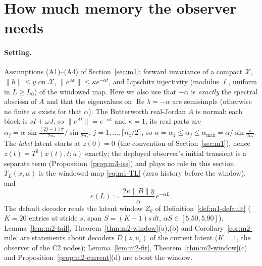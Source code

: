 \section{How much memory the observer needs}\label{sec:m2}

\paragraph{Setting.} Assumptions (A1)--(A4) of Section~\ref{sec:m1}: forward invariance of a compact
$\mathcal X$, $\|h\|\le\bar y$ on $\mathcal X$, $\|e^{At}\|\le\kappa e^{-\alpha t}$, and Lipschitz injectivity
(modulus $\ell$, uniform in $L\ge L_0$) of the windowed map. Here we also use that $-\alpha$ is \emph{exactly} the
spectral abscissa of $A$ and that the eigenvalues on $\operatorname{Re}\lambda=-\alpha$ are semisimple (otherwise no
finite $\kappa$ exists for that $\alpha$). The Butterworth real-Jordan $A$ is normal: each block is $sI+\omega J$,
so $\|e^{At}\|=e^{-\alpha t}$ and $\kappa=1$; its real parts are
$\alpha_j=\alpha\,\sin\frac{(2j-1)\pi}{2n_z}/\sin\frac{\pi}{2n_z}$, $j=1,\dots,\lceil n_z/2\rceil$, so
$\alpha=\alpha_1\le\alpha_j\le\alpha_{\max}=\alpha/\sin\frac{\pi}{2n_z}$. The \emph{label} latent starts at
$z(0)=0$ (the convention of Section~\ref{sec:m1}), hence $z(t)=T^0(x(t),t;u)$ exactly; the deployed observer's
initial transient is a separate term (Proposition~\ref{prop:m3-iss}) and plays no role in this section.
$T_L(x,w)$ is the windowed map \eqref{eq:m1-TL} (zero history before the window), and
\[
 \varepsilon(L):=\frac{2\kappa\|B\|\bar y}{\alpha}\,e^{-\alpha L}.
\]
 The default decoder reads the latent window $Z_k$ of Definition~\ref{def:m1-default} ($K=20$ entries
at stride $s$, span $S=(K-1)s\,dt$, $\alpha S\in[5.50,5.90]$). Lemma~\ref{lem:m2-tail}, Theorem~\ref{thm:m2-window}(a),(b)
and Corollary~\ref{cor:m2-rule} are statements about decoders $D(z,u_t)$ of the current latent ($K=1$, the observer of
the C2 nodes); Lemma~\ref{lem:m2-fir}, Theorem~\ref{thm:m2-window}(c) and Proposition~\ref{prop:m2-current}(d) are
about the window.

